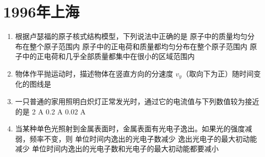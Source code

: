 \documentclass[\gkver]{gaokaozhenti}
\begin{document}
\chapter{1996年上海}

\begin{enumerate}
\item
根据卢瑟福的原子核式结构模型，下列说法中正确的是
{原子中的质量均匀分布在整个原子范围内}
{原子中的正电荷和质量都均匀分布在整个原子范围内}
{原子中的正电荷和几乎全部质量都集中在很小的区域范围内}

\item
物体作平抛运动时，描述物体在竖直方向的分速度 $v_{y}$（取向下为正）随时间变化的图线是
\fourchoices[answer=D, ispicture=true, h=3.2cm]
{}
{}
{}
{}

\item
一只普通的家用照明白炽灯正常发光时，通过它的电流值与下列数值较为接近的是
{2 A}
{0.2 A}
{0.02 A}

\item
当某种单色光照射到金属表面时，金属表面有光电子逸出。如果光的强度减弱，频率不变，则
{单位时间内逸出的光电子数减少}
{逸出光电子的最大初动能减少}
{单位时间内逸出的光电子数和光电子的最大初动能都要减小}


\end{enumerate}
\end{document}
